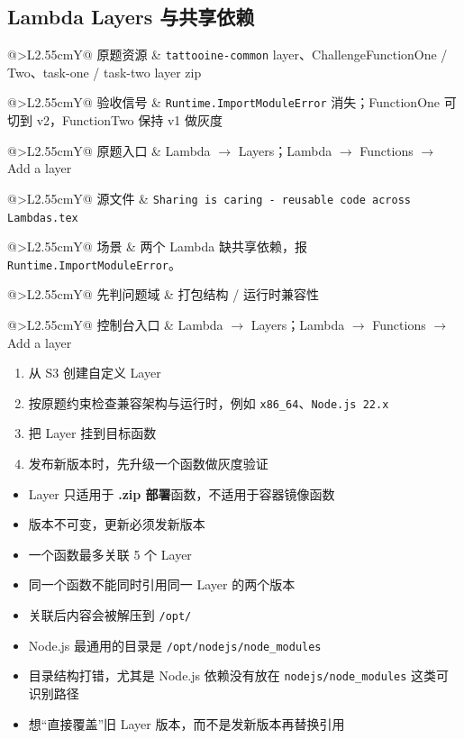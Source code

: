 \documentclass[12pt,a4paper]{article}
\makeatletter
\newcommand{\labelline}[2]{%
  \par\noindent
  \begin{tabularx}{\linewidth}{@{}>{\color{terracotta}\sffamily\bfseries}L{2.55cm}Y@{}}
    #1 & #2
  \end{tabularx}\par
}
\newcommand{\scene}[1]{\labelline{场景}{#1}}
\newcommand{\entry}[1]{\labelline{控制台入口}{#1}}
\newcommand{\firstcheck}[1]{\labelline{先判问题域}{#1}}
\newcommand{\term}[1]{\textcolor{terracotta}{\textbf{#1}}}
\newcommand{\flow}{\ensuremath{\rightarrow}}
\newcommand{\challengecard}[4]{%
\begin{challengebox}
  \labelline{原题资源}{#1}
  \labelline{验收信号}{#2}
  \labelline{原题入口}{#3}
  \labelline{源文件}{\texttt{#4}}
\end{challengebox}
}
\makeatother
\begin{document}
\subsection{Lambda Layers 与共享依赖}\label{sec:lambda-layers}

\challengecard
  {\texttt{tattooine-common} layer、ChallengeFunctionOne / Two、task-one / task-two layer zip}
  {\texttt{Runtime.ImportModuleError} 消失；FunctionOne 可切到 v2，FunctionTwo 保持 v1 做灰度}
  {Lambda \flow{} Layers；Lambda \flow{} Functions \flow{} Add a layer}
  {Sharing is caring - reusable code across Lambdas.tex}

\begin{actionbox}
  \scene{两个 Lambda 缺共享依赖，报 \texttt{Runtime.ImportModuleError}。}
  \firstcheck{打包结构 / 运行时兼容性}
  \entry{Lambda \flow{} Layers；Lambda \flow{} Functions \flow{} Add a layer}
  \begin{enumerate}
    \item 从 S3 创建自定义 Layer
    \item 按原题约束检查兼容架构与运行时，例如 \texttt{x86\_64}、\texttt{Node.js 22.x}
    \item 把 Layer 挂到目标函数
    \item 发布新版本时，先升级一个函数做灰度验证
  \end{enumerate}
\end{actionbox}

\begin{principlebox}
  \begin{itemize}
    \item Layer 只适用于 \term{.zip 部署}函数，不适用于容器镜像函数
    \item 版本不可变，更新必须发新版本
    \item 一个函数最多关联 5 个 Layer
    \item 同一个函数不能同时引用同一 Layer 的两个版本
    \item 关联后内容会被解压到 \texttt{/opt/}
    \item Node.js 最通用的目录是 \texttt{/opt/nodejs/node\_modules}
  \end{itemize}
\end{principlebox}

\begin{pitfallbox}
  \begin{itemize}
    \item 目录结构打错，尤其是 Node.js 依赖没有放在 \texttt{nodejs/node\_modules} 这类可识别路径
    \item 想“直接覆盖”旧 Layer 版本，而不是发新版本再替换引用
  \end{itemize}
\end{pitfallbox}
\end{document}
